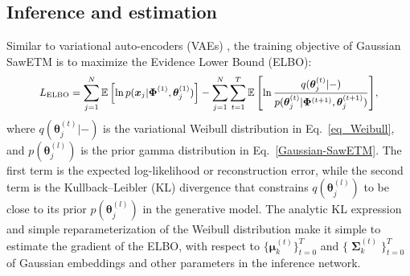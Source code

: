 \documentclass{article}
\newcommand{\Omegav}[0]{\ensuremath{\boldsymbol{\Omega}} }
\newcommand{\Sigmamat}[0]{\ensuremath{\boldsymbol{\Sigma}} }
\begin{document}
\subsection{Inference and estimation} \label{Inference and Estimation}
Similar to variational auto-encoders (VAEs) \cite{kingma2013auto, rezende2014stochastic}, the training objective of Gaussian SawETM is to maximize the Evidence Lower Bound (ELBO):
\begin{equation} \label{ELBO}
\small
\begin{split}
L _{\text{ELBO}} = \sum_{j = 1}^N {\mathbb{E}}\left[ {\ln p({\bm{x}_j}|{\bm{\Phi} ^{(1)}},\bm{\theta} _j^{(1)})} \right]  - \sum_{j = 1}^N {\sum_{t = 1}^T {{\mathbb{E}}\left[ {\ln \frac{{q(\bm{\theta} _j^{(t)}| - )}}{{p(\bm{\theta} _j^{(t)}|{\bm{\Phi} ^{(t + 1)}},\bm{\theta} _j^{(t + 1)})}}} \right]} },
\end{split}
\end{equation}
where $q(\bm{\theta} _j^{(t)}| - )$ is the variational Weibull distribution in Eq.~\eqref{eq_Weibull}, and  $p(\bm{\theta}^{(l)}_j)$ is the prior gamma distribution in Eq.~\eqref{Gaussian-SawETM}. The first term is the expected log-likelihood or reconstruction error, while the second term is the Kullback--Leibler (KL) divergence that constrains $q(\bm{\theta}^{(l)}_j)$ to be close to its prior $p(\bm{\theta}^{(l)}_j)$ in the generative model. The analytic KL expression and simple reparameterization of the Weibull distribution make it simple to estimate the gradient of the ELBO, with respect to $\{\bm{\mu} _k^{\left( t \right)}\}^{T}_{t=0}$ and  $\{ \mathop{\Sigmamat} \nolimits_k^{\left( t \right)}\}^{T}_{t=0}$ of Gaussian embeddings and other parameters in the inference network. 
\end{document}
